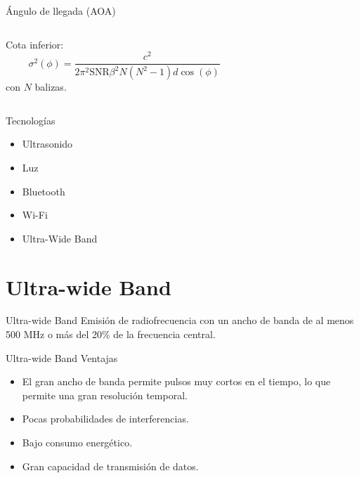 \documentclass{beamer}
\begin{document}
      \begin{frame}{Ángulo de llegada (AOA)}
        \begin{columns}
          \begin{column}{0.5\textwidth}
            Cota inferior:
            \begin{equation*}
              \sigma^2(\phi) = \frac{c^2}{2\pi^2 \text{SNR} \beta^2 N(N^2-1)d\cos(\phi)}
            \end{equation*}
            con $N$ balizas.
          \end{column}
          \begin{column}{0.5\textwidth}  
            \begin{figure}[H]
              \centering
              \def\svgwidth{\linewidth}
              
              \label{fig:AOA}
          \end{figure}
          \end{column}
          \end{columns}
      \end{frame}

  \begin{frame}{Tecnologías}
    \begin{itemize}
      \item Ultrasonido
      \item Luz
      \item Bluetooth
      \item Wi-Fi
      \item Ultra-Wide Band
    \end{itemize}
  \end{frame}

  \section{Ultra-wide Band}
  \begin{frame}{Ultra-wide Band}
    Emisión de radiofrecuencia con un ancho de banda de al menos 500 MHz o más del 20\% de la frecuencia central.
  \end{frame}

  \begin{frame}{Ultra-wide Band}
    Ventajas
    \begin{itemize}
      \item El gran ancho de banda permite pulsos muy cortos en el tiempo, lo que permite una gran resolución temporal.
      \item Pocas probabilidades de interferencias.
      \item Bajo consumo energético.
      \item Gran capacidad de transmisión de datos.
    \end{itemize}
  \end{frame}
\end{document}
